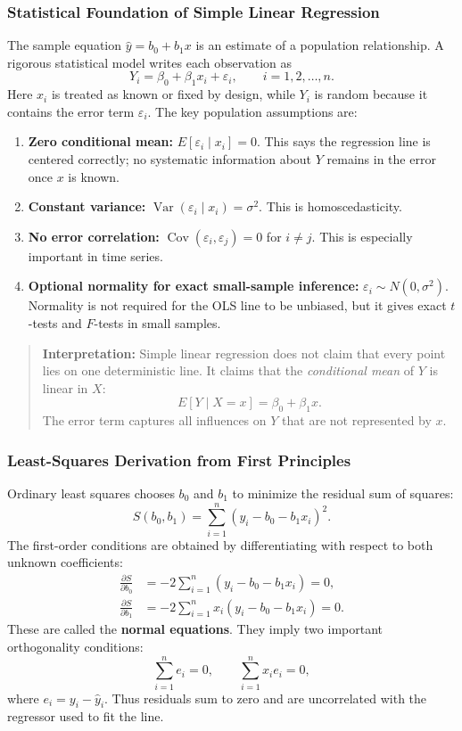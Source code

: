 \documentclass[12pt,openany]{book}
\begin{document}
\subsubsection{Statistical Foundation of Simple Linear Regression}

The sample equation \(\hat{y}=b_0+b_1x\) is an estimate of a population relationship. A rigorous statistical model writes each observation as
\[
Y_i=\beta_0+\beta_1x_i+\varepsilon_i, \qquad i=1,2,\dots,n.
\]
Here \(x_i\) is treated as known or fixed by design, while \(Y_i\) is random because it contains the error term \(\varepsilon_i\). The key population assumptions are:
\begin{enumerate}[leftmargin=*]
    \item \textbf{Zero conditional mean:} \(E[\varepsilon_i\mid x_i]=0\). This says the regression line is centered correctly; no systematic information about \(Y\) remains in the error once \(x\) is known.
    \item \textbf{Constant variance:} \(\operatorname{Var}(\varepsilon_i\mid x_i)=\sigma^2\). This is homoscedasticity.
    \item \textbf{No error correlation:} \(\operatorname{Cov}(\varepsilon_i,\varepsilon_j)=0\) for \(i\neq j\). This is especially important in time series.
    \item \textbf{Optional normality for exact small-sample inference:} \(\varepsilon_i\sim N(0,\sigma^2)\). Normality is not required for the OLS line to be unbiased, but it gives exact \(t\)-tests and \(F\)-tests in small samples.
\end{enumerate}

\begin{quote}
\textbf{Interpretation:} Simple linear regression does not claim that every point lies on one deterministic line. It claims that the \textit{conditional mean} of \(Y\) is linear in \(X\):
\[
E[Y\mid X=x]=\beta_0+\beta_1x.
\]
The error term captures all influences on \(Y\) that are not represented by \(x\).
\end{quote}

\subsubsection{Least-Squares Derivation from First Principles}

Ordinary least squares chooses \(b_0\) and \(b_1\) to minimize the residual sum of squares:
\[
S(b_0,b_1)=\sum_{i=1}^{n}(y_i-b_0-b_1x_i)^2.
\]
The first-order conditions are obtained by differentiating with respect to both unknown coefficients:
\begin{align*}
\frac{\partial S}{\partial b_0} &=-2\sum_{i=1}^{n}(y_i-b_0-b_1x_i)=0,\\
\frac{\partial S}{\partial b_1} &=-2\sum_{i=1}^{n}x_i(y_i-b_0-b_1x_i)=0.
\end{align*}
These are called the \textbf{normal equations}. They imply two important orthogonality conditions:
\[
\sum_{i=1}^{n}e_i=0, \qquad \sum_{i=1}^{n}x_ie_i=0,
\]
where \(e_i=y_i-\hat{y}_i\). Thus residuals sum to zero and are uncorrelated with the regressor used to fit the line.
\end{document}
